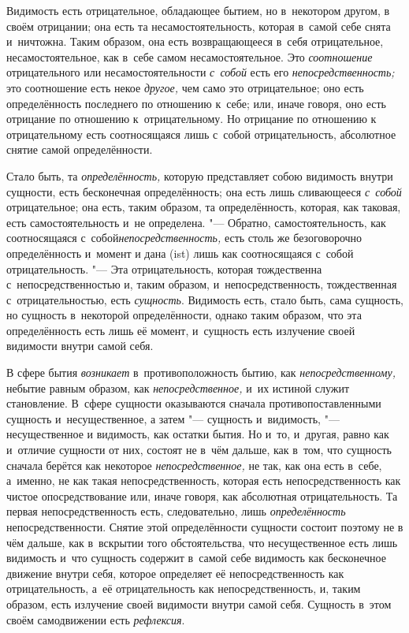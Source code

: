 Видимость есть отрицательное, обладающее бытием, но в~некотором другом, в
своём отрицании; она есть та несамостоятельность, которая в~самой себе
снята и~ничтожна. Таким образом, она есть возвращающееся в~себя
отрицательное, несамостоятельное, как в~себе самом несамостоятельное. Это
{\em соотношение} отрицательного или
несамостоятельности {\em с~собой} есть его
{\em непосредственность;} это соотношение есть некое
{\em другое,} чем само это отрицательное; оно есть
определённость последнего по отношению к~себе; или, иначе говоря, оно есть
отрицание по отношению к~отрицательному. Но отрицание по отношению к
отрицательному есть соотносящаяся лишь с~собой отрицательность, абсолютное
снятие самой определённости.

Стало быть, та {\em определённость,} которую
представляет собою видимость внутри сущности, есть бесконечная
определённость; она есть лишь сливающееся {\em с~собой}
отрицательное; она есть, таким образом, та определённость, которая, как
таковая, есть самостоятельность и~не определена. "--- Обратно,
самостоятельность, как соотносящаяся с~собой{\em непосредственность,}
есть столь же безоговорочно определённость и~момент и
дана (ist) лишь как соотносящаяся с~собой отрицательность. "--- Эта
отрицательность, которая тождественна с~непосредственностью и, таким
образом, и~непосредственность, тождественная с~отрицательностью, есть
{\em сущность}. Видимость есть, стало быть, сама
сущность, но сущность в~некоторой определённости, однако таким образом, что
эта определённость есть лишь её момент, и~сущность есть излучение своей
видимости внутри самой себя.

В сфере бытия {\em возникает} в~противоположность бытию,
как {\em непосредственному,} небытие равным образом,
как {\em непосредственное,} и~их истиной служит становление. В~сфере
сущности оказываются сначала противопоставленными сущность и~несущественное,
а затем "--- сущность и~видимость, "--- несущественное
и видимость, как остатки бытия. Но и~то, и~другая, равно как и~отличие
сущности от них, состоят не в~чём дальше, как в~том, что сущность сначала
берётся как некоторое {\em непосредственное,} не так,
как она есть в~себе, а~именно, не как такая непосредственность, которая
есть непосредственность как чистое опосредствование или, иначе говоря, как
абсолютная отрицательность. Та первая непосредственность есть,
следовательно, лишь {\em определённость}
непосредственности. Снятие этой определённости сущности состоит поэтому не
в чём дальше, как в~вскрытии того обстоятельства, что несущественное есть
лишь видимость и~что сущность содержит в~самой себе видимость как
бесконечное движение внутри себя, которое определяет её непосредственность
как отрицательность, а~её отрицательность как непосредственность, и, таким
образом, есть излучение своей видимости внутри самой себя. Сущность в~этом
своём самодвижении есть {\em рефлексия}.

